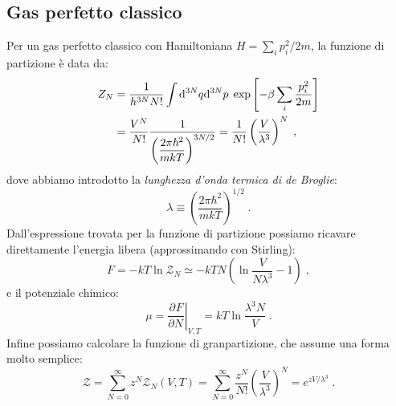 \documentclass[10pt,a4paper]{report}
\theoremstyle{definition}
\newcommand{\pdev}[3][]{\frac{\partial^{#1} #2}{\partial #3^{#1}}}
\numberwithin{equation}{section}
\newcommand{\diff}[1][]{\mathrm{d}#1}
\newcommand{\zpart}{\mathcal{Z}}
\begin{document}
\subsection{Gas perfetto classico}
Per un gas perfetto classico con Hamiltoniana $H=\sum_i p_i^2/2m$, la funzione di partizione è data da:
\begin{align}
Z_N&=\frac{1}{h^{3N}N!}\int\diff^{3N}{q}\diff^{3N}{p}\;\exp\left[-\beta\sum_i \frac{p_i^2}{2m}\right] \notag \\
&= \frac{V^N}{N!}\frac{1}{\left(\dfrac{2\pi\hbar^2}{mkT}\right)^{3N/2}}= \frac{1}{N!}\left(\frac{V}{\lambda^3}\right)^N\;,
\end{align}
dove abbiamo introdotto la \emph{lunghezza d'onda termica di de Broglie}:
\begin{equation}
\lambda \equiv \left(\frac{2\pi\hbar^2}{mkT}\right)^{1/2}\;.
\end{equation}
Dall'espressione trovata per la funzione di partizione possiamo ricavare direttamente l'energia libera (approssimando con Stirling):
\begin{equation}
F=-kT\ln\zpart_N\simeq -kTN\left(\ln\frac{V}{N\lambda^3}-1\right)\;,
\end{equation}
e il potenziale chimico:
\begin{equation}
\mu=\left.\pdev{F}{N}\right|_{V,T}=kT\ln\frac{\lambda^3N}{V}\;.
\end{equation}
Infine possiamo calcolare la funzione di granpartizione, che assume una forma molto semplice:
\begin{equation}
\zpart=\sum_{N=0}^{\infty}z^N\zpart_N(V,T)=\sum_{N=0}^{\infty}\frac{z^N}{N!}\left(\frac{V}{\lambda^3}\right)^N=e^{zV/\lambda^3}\;.
\end{equation}
\end{document}
